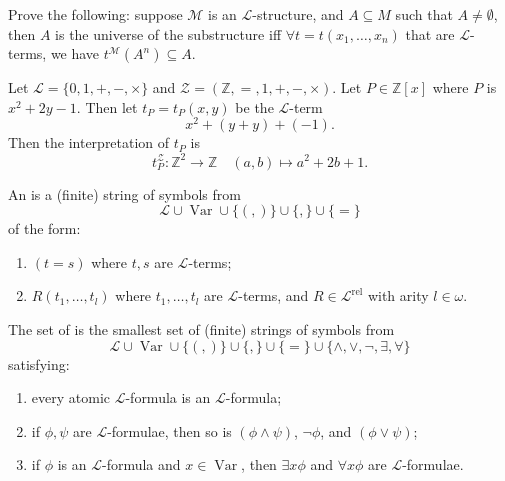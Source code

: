 \documentclass[notoc,notitlepage]{tufte-book}
\DeclareMathOperator{\Var}{Var }
\DeclareMathOperator{\rel}{rel}
\begin{document}
\begin{ex}
  Prove the following: suppose $\mathcal{M}$ is an $\mathcal{L}$-structure, and $A \subseteq M$ such that $A \neq \emptyset$, then $A$ is the universe of the substructure iff $\forall t = t(x_1, \ldots, x_n)$ that are $\mathcal{L}$-terms, we have $t^\mathcal{M} (A^n) \subseteq A$.
\end{ex}

\begin{eg}
  Let $\mathcal{L} = \{ 0, 1, +, -, \times \}$ and $\mathcal{Z} = (\mathbb{Z}, =, 1, + , -, \times)$. Let $P \in \mathbb{Z} [x]$ where $P$ is $x^2 +2y - 1$. Then let $t_P = t_P(x, y)$ be the $\mathcal{L}$-term
  \begin{equation*}
    x^2 + (y + y) + (-1).
  \end{equation*}
  Then the interpretation of $t_P$ is
  \begin{equation*}
    t_P^\mathcal{Z} : \mathbb{Z}^2 \to \mathbb{Z} \quad (a, b) \mapsto a^2 + 2b + 1.
  \end{equation*}
\end{eg}

\begin{defn}\label{defn:atomic_l_formulas}
  An  is a (finite) string of symbols from
  \begin{equation*}
    \mathcal{L} \cup \Var \cup \{ (, ) \} \cup \{ , \} \cup \{ = \}
  \end{equation*}
  of the form:
  \begin{enumerate}
    \item $(t = s)$ where $t, s$ are $\mathcal{L}$-terms;
    \item $R(t_1, \ldots, t_l)$ where $t_1, \ldots, t_l$ are $\mathcal{L}$-terms, and $R \in \mathcal{L}^{\rel}$ with arity $l \in \omega$.
  \end{enumerate}
\end{defn}

\begin{defn}\label{defn:l_formulas}
  The set of  is the smallest set of (finite) strings of symbols from
  \begin{equation*}
    \mathcal{L} \cup \Var \cup \{ (, ) \} \cup \{ , \} \cup \{ = \} \cup \{ \land, \lor, \neg, \exists, \forall \}
  \end{equation*}
  satisfying:
  \begin{enumerate}
    \item every atomic $\mathcal{L}$-formula is an $\mathcal{L}$-formula;
    \item if $\phi, \psi$ are $\mathcal{L}$-formulae, then so is $(\phi \land \psi)$, $\neg \phi$, and $(\phi \lor \psi)$;
    \item if $\phi$ is an $\mathcal{L}$-formula and $x \in \Var$, then $\exists x \phi$ and $\forall x \phi$ are $\mathcal{L}$-formulae.
  \end{enumerate}
\end{defn}
\end{document}
